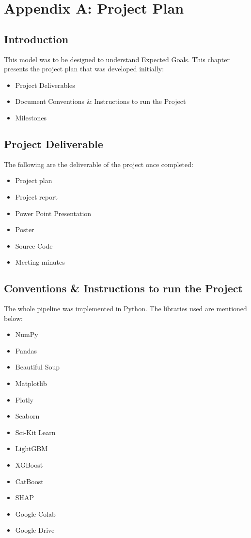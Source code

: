 \chapter{Appendix A: Project Plan}
\section{Introduction}
This model was to be designed to understand Expected Goals. This chapter presents the project plan that was developed initially:
\begin{itemize}
\setlength\itemsep{-0.6em}
    \item Project Deliverables
    \item Document Conventions \& Instructions to run the Project
    \item Milestones
\end{itemize}

\section{Project Deliverable}
The following are the deliverable of the project once completed:
\begin{itemize}
\setlength\itemsep{-0.6em}
    \item Project plan
    \item Project report
    \item Power Point Presentation
    \item Poster
    \item Source Code
    \item Meeting minutes
\end{itemize}

\section{Conventions \& Instructions to run the Project}

The whole pipeline was implemented in Python. The libraries used are mentioned below:
\begin{itemize}
\setlength\itemsep{-0.6em}
    \item NumPy
    \item Pandas
    \item Beautiful Soup 
    \item Matplotlib
    \item Plotly
    \item Seaborn
    \item Sci-Kit Learn
    \item LightGBM
    \item XGBoost
    \item CatBoost
    \item SHAP
    \item Google Colab
    \item Google Drive
\end{itemize}

